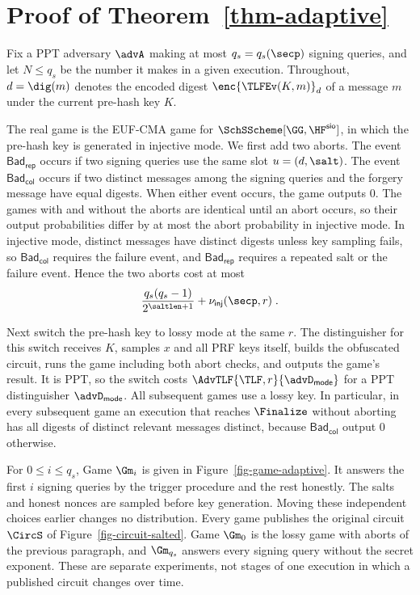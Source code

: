 \section{Proof of Theorem~\ref{thm-adaptive}} \label{app-adaptive}

Fix a PPT adversary $\advA$ making at most $q_s=q_s(\secp)$ signing queries, and let $N\le q_s$ be the number it makes in a given execution. Throughout, $d=\dig(m)$ denotes the encoded digest $\enc{\TLFEv(K,m)}_d$ of a message $m$ under the current pre-hash key $K$.

 The real game is the EUF-CMA game for $\SchSScheme[\GG,\HF^{\mathsf{sio}}]$, in which the pre-hash key is generated in injective mode. We first add two aborts. The event $\mathsf{Bad}_{\mathsf{rep}}$ occurs if two signing queries use the same slot $u=(d,\salt)$. The event $\mathsf{Bad}_{\mathsf{col}}$ occurs if two distinct messages among the signing queries and the forgery message have equal digests. When either event occurs, the game outputs 0. The games with and without the aborts are identical until an abort occurs, so their output probabilities differ by at most the abort probability in injective mode. In injective mode, distinct messages have distinct digests unless key sampling fails, so $\mathsf{Bad}_{\mathsf{col}}$ requires the failure event, and $\mathsf{Bad}_{\mathsf{rep}}$ requires a repeated salt or the failure event. Hence the two aborts cost at most
$$
\frac{q_s(q_s-1)}{2^{\saltlen+1}}+\nu_{\mathsf{inj}}(\secp,r) \;.
$$

Next switch the pre-hash key to lossy mode at the same $r$. The distinguisher for this switch receives $K$, samples $x$ and all PRF keys itself, builds the obfuscated circuit, runs the game including both abort checks, and outputs the game's result. It is PPT, so the switch costs $\AdvTLF{\TLF,r}{\advD_{\mathsf{mode}}}$ for a PPT distinguisher $\advD_{\mathsf{mode}}$. All subsequent games use a lossy key. In particular, in every subsequent game an execution that reaches $\Finalize$ without aborting has all digests of distinct relevant messages distinct, because $\mathsf{Bad}_{\mathsf{col}}$ output 0 otherwise.

 For $0\le i\le q_s$, Game $\Gm_i$ is given in Figure~\ref{fig-game-adaptive}. It answers the first $i$ signing queries by the trigger procedure and the rest honestly. The salts and honest nonces are sampled before key generation. Moving these independent choices earlier changes no distribution. Every game publishes the original circuit $\CircS$ of Figure~\ref{fig-circuit-salted}. Game $\Gm_0$ is the lossy game with aborts of the previous paragraph, and $\Gm_{q_s}$ answers every signing query without the secret exponent. These are separate experiments, not stages of one execution in which a published circuit changes over time.

